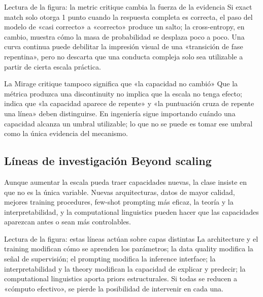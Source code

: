 \begin{knowledgebox}{Lectura de la figura: la metric critique cambia la fuerza de la evidencia}
Si exact match solo otorga 1 punto cuando la respuesta completa es correcta, el paso del modelo de «casi correcto» a «correcto» produce un salto; la cross-entropy, en cambio, muestra cómo la masa de probabilidad se desplaza poco a poco. Una curva continua puede debilitar la impresión visual de una «transición de fase repentina», pero no descarta que una conducta compleja solo sea utilizable a partir de cierta escala práctica.
\end{knowledgebox}

\begin{warningbox}{La Mirage critique tampoco significa que «la capacidad no cambió»}
Que la métrica produzca una discontinuity no implica que la escala no tenga efecto; indica que «la capacidad aparece de repente» y «la puntuación cruza de repente una línea» deben distinguirse. En ingeniería sigue importando cuándo una capacidad alcanza un umbral utilizable; lo que no se puede es tomar ese umbral como la única evidencia del mecanismo.
\end{warningbox}


\subsection{Líneas de investigación Beyond scaling}

Aunque aumentar la escala pueda traer capacidades nuevas, la clase insiste en que no es la única variable. Nuevas arquitecturas, datos de mayor calidad, mejores training procedures, few-shot prompting más eficaz, la teoría y la interpretabilidad, y la computational linguistics pueden hacer que las capacidades aparezcan antes o sean más controlables.


\begin{knowledgebox}{Lectura de la figura: estas líneas actúan sobre capas distintas}
La architecture y el training modifican cómo se aprenden los parámetros; la data quality modifica la señal de supervisión; el prompting modifica la inference interface; la interpretabilidad y la theory modifican la capacidad de explicar y predecir; la computational linguistics aporta priors estructurales. Si todas se reducen a «cómputo efectivo», se pierde la posibilidad de intervenir en cada una.
\end{knowledgebox}

